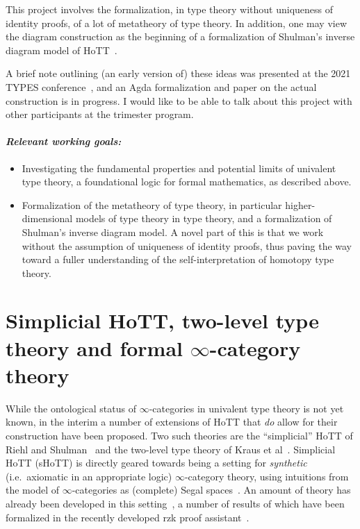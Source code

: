 \documentclass[a4paper]{article}
\begin{document}
This project involves the formalization, in type theory without uniqueness of identity proofs, of a lot of metatheory of type theory.
In addition, one may view the diagram construction as the beginning of a formalization of Shulman's inverse diagram model of HoTT~\cite{shulman:15:univalence}.

A brief note outlining (an early version of) these ideas was presented at the 2021 TYPES conference~\cite{chen-kraus:21:internal}, and an Agda formalization and paper on the actual construction is in progress.
I would like to be able to talk about this project with other participants at the trimester program.

\paragraph{\normalfont \emph{Relevant working goals:}}
\begin{itemize}
    \item Investigating the fundamental properties and potential limits of univalent type theory, a foundational logic for formal mathematics, as described above.
    \item Formalization of the metatheory of type theory, in particular higher-dimensional models of type theory in type theory, and a formalization of Shulman's inverse diagram model.
    A novel part of this is that we work without the assumption of uniqueness of identity proofs, thus paving the way toward a fuller understanding of the self-interpretation of homotopy type theory.
\end{itemize}


\section*{Simplicial HoTT, two-level type theory and formal $\infty$-category theory}

While the ontological status of $\infty$-categories in univalent type theory is not yet known, in the interim a number of extensions of HoTT that \emph{do} allow for their construction have been proposed.
Two such theories are the ``simplicial'' HoTT of Riehl and Shulman~\cite{riehl-shulman:17:simplicial-tt} and the two-level type theory of Kraus et al~\cite{acks:17:2ltt}.
Simplicial HoTT (sHoTT) is directly geared towards being a setting for \emph{synthetic} (i.e.\ axiomatic in an appropriate logic) $\infty$-category theory, using intuitions from the model of $\infty$-categories as (complete) Segal spaces~\cite{rezk:01:model}.
An amount of theory has already been developed in this setting~\cite{cite}, a number of results of which have been formalized in the recently developed rzk proof assistant~\cite{cite}.
\end{document}
